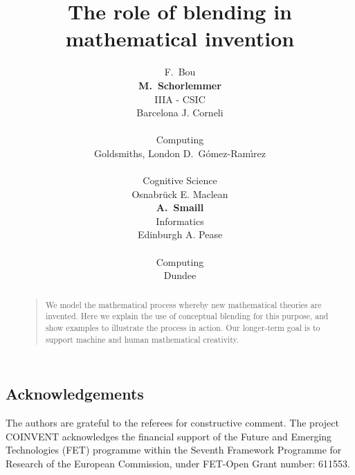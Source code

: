 \documentclass[letterpaper]{article}
\title{The role of blending in mathematical invention}
\author{F.\ Bou \\ \Large{\textbf{M.\ Schorlemmer}}\\IIIA - CSIC \\ Barcelona
        \And J. Corneli \\ \mbox{} \\ Computing \\Goldsmiths, London
        \And D.\ G{\'o}mez-Ram{\'{\i}}rez\\ \mbox{} \\Cognitive Science \\Osnabr{\"u}ck
        \And E. Maclean \\\Large{\textbf{A.\ Smaill}}\\ Informatics\\ Edinburgh
        \And A. Pease \\ \mbox{} \\ Computing \\ Dundee}
\begin{document}
 
\maketitle
\begin{abstract}
\begin{quote}
  We model the mathematical process whereby new mathematical theories
  are invented.  Here we
  explain the use of conceptual blending for this purpose, and show
  examples to illustrate the process in action.  Our longer-term goal
  is to support machine and human mathematical creativity.
\end{quote}
\end{abstract}










\subsection*{Acknowledgements}

The authors are grateful to the referees for constructive comment.
The project COINVENT acknowledges the financial support
of the Future and Emerging Technologies (FET) programme
within the Seventh Framework Programme for Research of
the European Commission, under FET-Open Grant number:
611553.

\printbibliography
\end{document}
